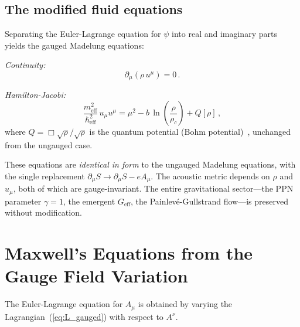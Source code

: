 \documentclass[12pt, a4paper]{article}
\newcommand{\Geff}{G_{\mathrm{eff}}}
\newcommand{\meff}{m_{\mathrm{eff}}}
\newcommand{\heff}{\hbar_{\mathrm{eff}}}
\begin{document}
\subsection{The modified fluid equations}

Separating the Euler-Lagrange equation for $\psi$ into real and imaginary parts yields the gauged Madelung equations:

\emph{Continuity:}
\begin{equation}
    \partial_\mu(\rho\,u^\mu) = 0\,.
\label{eq:continuity_gauged}
\end{equation}

\emph{Hamilton-Jacobi:}
\begin{equation}
    \frac{\meff^2}{\heff^2}\,u_\mu u^\mu
    = \mu^2 - b\,\ln\!\left(\frac{\rho}{\rho_c}\right)
    + Q[\rho]\,,
\label{eq:hj_gauged}
\end{equation}
where $Q = \Box\sqrt{\rho}/\sqrt{\rho}$ is the quantum potential (Bohm potential)~\cite{holland_1993}, unchanged from the ungauged case.

These equations are \emph{identical in form} to the ungauged Madelung equations, with the single replacement $\partial_\mu S \to \partial_\mu S - eA_\mu$. The acoustic metric depends on $\rho$ and $u_\mu$, both of which are gauge-invariant. The entire gravitational sector---the PPN parameter $\gamma = 1$, the emergent $\Geff$, the Painlev\'{e}-Gullstrand flow---is preserved without modification.


\section{Maxwell's Equations from the Gauge Field Variation}
\label{sec:maxwell}

The Euler-Lagrange equation for $A_\mu$ is obtained by varying the Lagrangian~(\ref{eq:L_gauged}) with respect to $A^\nu$.
\end{document}
